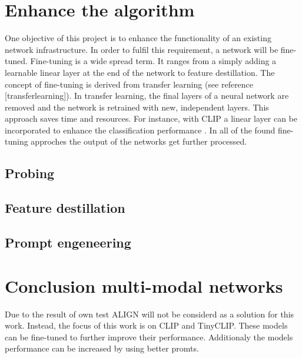 
\section{Enhance the algorithm}

    One objective of this project is to enhance the functionality of an existing network infrastructure.
    In order to fulfil this requirement, a network will be fine-tuned.
    Fine-tuning is a wide spread term.
    It ranges from a simply adding a learnable linear layer at the end of the network to feature destillation.
    The concept of fine-tuning is derived from transfer learning (see reference [transferlearning]).
    In transfer learning, the final layers of a neural network are removed and the network is retrained with new, independent layers.
    This approach saves time and resources.
    For instance, with CLIP a linear layer can be incorporated to enhance the classification performance \cite{finetuneclip}.
    In all of the found fine-tuning approches the output of the networks get further processed.

    \subsection{Probing}
    \subsection{Feature destillation}
    \subsection{Prompt engeneering}


\section{Conclusion multi-modal networks}
    Due to the result of own test ALIGN will not be considerd as a solution for this work.
    Instead, the focus of this work is on CLIP and TinyCLIP.
    These models can be fine-tuned to further improve their performance.
    Additionaly the models performance can be increased by using better promts.